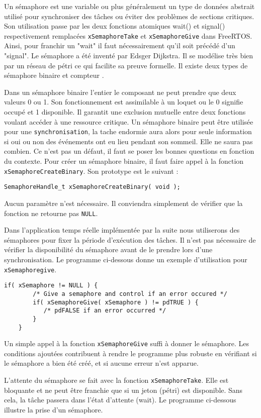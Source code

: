 Un sémaphore est une variable ou plus généralement un type de données abstrait utilisé pour synchroniser des tâches ou éviter des problèmes de sections critiques. 
Son utilisation passe par les deux fonctions atomiques wait() et signal() respectivement remplacées \texttt{xSemaphoreTake} et \texttt{xSemaphoreGive} dans FreeRTOS.
Ainsi, pour franchir un "wait" il faut nécessairement qu’il soit précédé d’un "signal". Le sémaphore a
été inventé par Edsger Dijkstra. Il se modélise très bien par un réseau de pétri ce qui facilite sa preuve
formelle. Il existe deux types de sémaphore binaire et compteur \cite{sem_wiki}.

Dans un sémaphore binaire l’entier le composant ne peut prendre que deux valeurs 0 ou 1. 
Son fonctionnement est assimilable à un loquet ou le 0 signifie occupé et 1 disponible. 
Il garantit une exclusion mutuelle entre deux fonctions voulant accéder à une ressource critique. 
Un sémaphore binaire peut être utilisée pour une \texttt{synchronisation}, la tache endormie aura alors pour seule information si oui ou non des événements ont eu lieu pendant son sommeil. 
Elle ne saura pas combien. 
Ce n’est pas un défaut, il faut se poser les bonnes questions en fonction du contexte. 
Pour créer un sémaphore binaire, il faut faire appel à la fonction \texttt{xSemaphoreCreateBinary}.
Son prototype est le suivant :
\begin{lstlisting}[style=CStyle]
    SemaphoreHandle_t xSemaphoreCreateBinary( void );
\end{lstlisting}
Aucun paramètre n'est nécessaire.
Il conviendra simplement de vérifier que la fonction ne retourne pas \texttt{NULL}.

Dans l'application temps réelle implémentée par la suite nous utiliserons des sémaphores pour fixer la période d'exécution des tâches.
Il n'est pas nécessaire de vérifier la disponibilité du sémaphore avant de le prendre lors d'une synchronisation.
Le programme ci-dessous donne un exemple d'utilisation pour \texttt{xSemaphoregive}.
\begin{lstlisting}[style=CStyle]
    if( xSemaphore != NULL ) {
        /* Give a semaphore and control if an error occured */
        if( xSemaphoreGive( xSemaphore ) != pdTRUE ) {
           /* pdFALSE if an error occurred */
        }
    }    
\end{lstlisting}
Un simple appel à la fonction \texttt{xSemaphoreGive} suffi à donner le sémaphore.
Les conditions ajoutées contribuent à rendre le programme plus robuste en vérifiant si le sémaphore a bien été créé, et si aucune erreur n'est apparue.

L'attente du sémaphore se fait avec la fonction \texttt{xSemaphoreTake}.
Elle est bloquante et ne peut être franchie que si un jeton (pétri) est disponible.
Sans cela, la tâche passera dans l'état d'attente (wait).
Le programme ci-dessous illustre la prise d'un sémaphore.
\begin{lstlisting}[style=CStyle]

\end{lstlisting}
